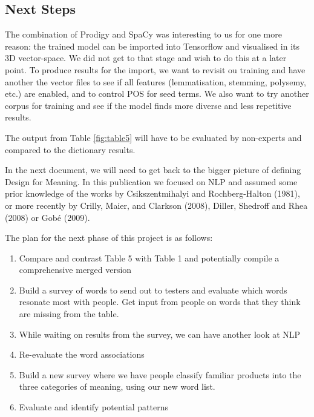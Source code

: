 \documentclass[12pt, usenames, dvipsnames]{report}
\begin{document}
\begin{flushleft}

\section{Next Steps}

The combination of Prodigy and SpaCy was interesting to us for one more reason: the trained model can be imported into Tensorflow and visualised in its 3D vector-space.
We did not get to that stage and wish to do this at a later point.
To produce results for the import, we want to revisit ou training and have another the vector files to see if all features (lemmatisation, stemming, polysemy, etc.) are enabled, and to control POS for seed terms.
We also want to try another corpus for training and see if the model finds more diverse and less repetitive results.

The output from Table \ref{fig:table5} will have to be evaluated by non-experts and compared to the dictionary results.

In the next document, we will need to get back to the bigger picture of defining Design for Meaning.
In this publication we focused on NLP and assumed some prior knowledge of the works by Csikszentmihalyi and Rochberg-Halton (1981), or more recently by Crilly, Maier, and Clarkson (2008), Diller, Shedroff and Rhea (2008) or Gobé (2009).

The plan for the next phase of this project is as follows:

\begin{enumerate}
	\item Compare and contrast Table 5 with Table 1 and potentially compile a comprehensive merged version
	\item Build a survey of words to send out to testers and evaluate which words resonate most with people. Get input from people on words that they think are missing from the table.
	\item While waiting on results from the survey, we can have another look at NLP
	\item Re-evaluate the word associations
	\item Build a new survey where we have people classify familiar products into the three categories of meaning, using our new word list.
	\item Evaluate and identify potential patterns
\end{enumerate}



\end{flushleft}
\end{document}
